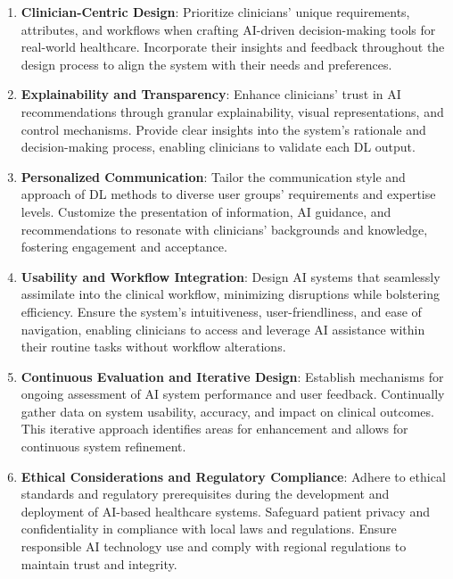 \begin{enumerate}

\item \textcolor{revised}{{\bf Clinician-Centric Design}:
Prioritize clinicians' unique requirements, attributes, and workflows when crafting \acs{AI}-driven decision-making tools for real-world healthcare.
Incorporate their insights and feedback throughout the design process to align the system with their needs and preferences.}

\vspace{0.05mm}

\item \textcolor{revised}{{\bf Explainability and Transparency}:
Enhance clinicians' trust in \ac{AI} recommendations through granular explainability, visual representations, and control mechanisms.
Provide clear insights into the system's rationale and decision-making process, enabling clinicians to validate each \ac{DL} output.}

\vspace{0.05mm}

\item \textcolor{revised}{{\bf Personalized Communication}:
Tailor the communication style and approach of \ac{DL} methods to diverse user groups' requirements and expertise levels.
Customize the presentation of information, \ac{AI} guidance, and recommendations to resonate with clinicians' backgrounds and knowledge, fostering engagement and acceptance.}

\vspace{0.05mm}

\item \textcolor{revised}{{\bf Usability and Workflow Integration}:
Design \ac{AI} systems that seamlessly assimilate into the clinical workflow, minimizing disruptions while bolstering efficiency.
Ensure the system's intuitiveness, user-friendliness, and ease of navigation, enabling clinicians to access and leverage \ac{AI} assistance within their routine tasks without workflow alterations.}

\vspace{0.05mm}

\item \textcolor{revised}{{\bf Continuous Evaluation and Iterative Design}:
Establish mechanisms for ongoing assessment of \ac{AI} system performance and user feedback.
Continually gather data on system usability, accuracy, and impact on clinical outcomes.
This iterative approach identifies areas for enhancement and allows for continuous system refinement.}

\vspace{0.05mm}

\item \textcolor{revised}{{\bf Ethical Considerations and Regulatory Compliance}:
Adhere to ethical standards and regulatory prerequisites during the development and deployment of \ac{AI}-based healthcare systems.
Safeguard patient privacy and confidentiality in compliance with local laws and regulations.
Ensure responsible \ac{AI} technology use and comply with regional regulations to maintain trust and integrity.}

\end{enumerate}


